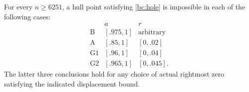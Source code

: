 \begin{proposition}\label{bc:boundary}
For every $n\geq6251$, a hull point satisfying \eqref{bc:hole} is
impossible in each of the following cases:
\begin{equation}\label{bc:boundary-scopes}
\begin{array}{c|c|c}
 &a&r\\ \hline
 \mathrm B&[.975,1]&\text{arbitrary}\\
 \mathrm A&[.85,1]&[0,.02]\\
 \mathrm {G1}&[.96,1]&[0,.04]\\
 \mathrm {G2}&[.965,1]&[0,.045].
\end{array}
\end{equation}
The latter three conclusions hold for any choice of actual rightmost
zero satisfying the indicated displacement bound.
\end{proposition}

